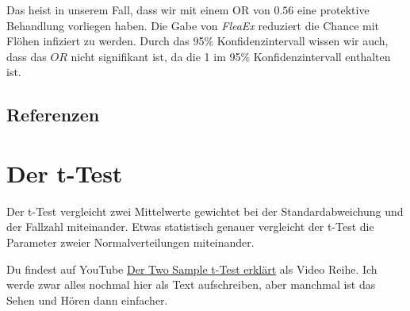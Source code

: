 \documentclass[
  letterpaper,
]{scrbook}
\begin{document}
Das heist in unserem Fall, dass wir mit einem OR von \(0.56\) eine
protektive Behandlung vorliegen haben. Die Gabe von \emph{FleaEx}
reduziert die Chance mit Flöhen infiziert zu werden. Durch das 95\%
Konfidenzintervall wissen wir auch, dass das \(OR\) nicht signifikant
ist, da die 1 im 95\% Konfidenzintervall enthalten ist.

\hypertarget{referenzen-5}{%
\section*{Referenzen}\label{referenzen-5}}

\hypertarget{sec-ttest}{%
\chapter{Der t-Test}\label{sec-ttest}}

\begin{tcolorbox}[enhanced jigsaw, coltitle=black, titlerule=0mm, bottomrule=.15mm, opacityback=0, opacitybacktitle=0.6, leftrule=.75mm, title=\textcolor{quarto-callout-note-color}{\faInfo}\hspace{0.5em}{Was macht der t-Test?}, toprule=.15mm, bottomtitle=1mm, toptitle=1mm, left=2mm, breakable, arc=.35mm, colback=white, rightrule=.15mm, colbacktitle=quarto-callout-note-color!10!white, colframe=quarto-callout-note-color-frame]
Der t-Test vergleicht zwei Mittelwerte gewichtet bei der
Standardabweichung und der Fallzahl miteinander. Etwas statistisch
genauer vergleicht der t-Test die Parameter zweier Normalverteilungen
miteinander.
\end{tcolorbox}

\begin{tcolorbox}[enhanced jigsaw, coltitle=black, titlerule=0mm, bottomrule=.15mm, opacityback=0, opacitybacktitle=0.6, leftrule=.75mm, title=\textcolor{quarto-callout-tip-color}{\faLightbulb}\hspace{0.5em}{Einführung in den t-Test per Video}, toprule=.15mm, bottomtitle=1mm, toptitle=1mm, left=2mm, breakable, arc=.35mm, colback=white, rightrule=.15mm, colbacktitle=quarto-callout-tip-color!10!white, colframe=quarto-callout-tip-color-frame]
Du findest auf YouTube \href{https://youtu.be/iECcenEDzOM}{Der Two
Sample t-Test erklärt} als Video Reihe. Ich werde zwar alles nochmal
hier als Text aufschreiben, aber manchmal ist das Sehen und Hören dann
einfacher.
\end{tcolorbox}
\end{document}
